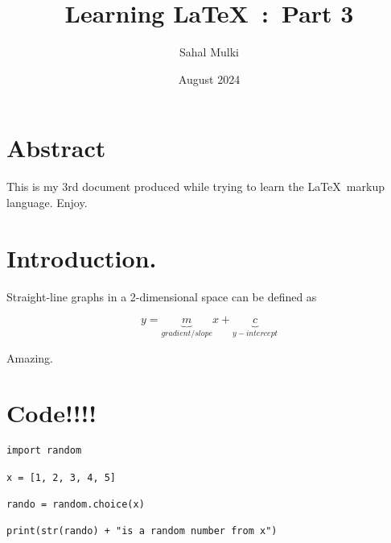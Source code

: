 \documentclass[twocolumn]{article}
\title{Learning \LaTeX \ :\  Part 3}
\author{Sahal Mulki}
\date{August 2024}
\begin{document}
\maketitle

\section{Abstract}

This is my 3rd document produced while trying to learn the \LaTeX \ markup language. Enjoy.

\newpage 

\section{Introduction.}

\lipsum[1-3]
\smallskip

Straight-line graphs in a 2-dimensional space can be defined as 

$$y = \underbrace{m}_{gradient/slope}x + \underbrace{c}_{y-intercept}$$

Amazing. \\ 

\section{Code!!!!}

\begin{verbatim}
import random

x = [1, 2, 3, 4, 5]

rando = random.choice(x)

print(str(rando) + "is a random number from x")

\end{verbatim}
\end{document}
